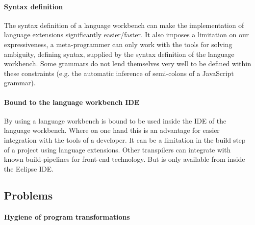 \paragraph{Syntax definition}
The syntax definition of a language workbench can make the implementation of language extensions significantly easier/faster. It also imposes a limitation on our expressiveness, a meta-programmer can only work with the tools for solving ambiguity, defining syntax, supplied by the syntax definition of the language workbench. Some grammars do not lend themselves very well to be defined within these constraints (e.g. the automatic inference of semi-colons of a JavaScript grammar).

\paragraph{Bound to the language workbench IDE}
By using a language workbench \projectname is bound to be used inside the IDE of the language workbench. Where on one hand this is an advantage for easier integration with the tools of a developer. It can be a limitation in the build step of a project using language extensions. Other transpilers can integrate with known build-pipelines for front-end technology. But \projectname is only available from inside the Eclipse IDE. 

\subsection{Problems}

\paragraph{Hygiene of program transformations}
